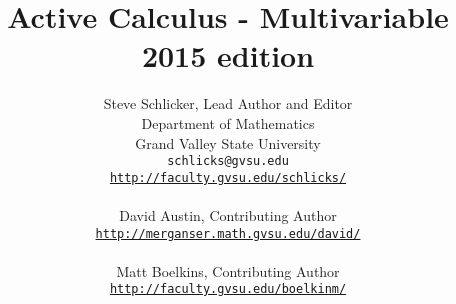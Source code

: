 \documentclass[11pt]{book}
\title{Active Calculus - Multivariable \\ \vspace{0.02in} \small{2015 edition} \\ \vspace{0.1in} \scalebox{0.75}{\texttt{[image: figures/CClicense.eps]}}}
\author{Steve Schlicker, Lead Author and Editor \\ Department of Mathematics \\ Grand Valley State University \\
\texttt{schlicks@gvsu.edu} \\
\href{http://faculty.gvsu.edu/schlicks/}{\texttt{http://faculty.gvsu.edu/schlicks/}}\\
\vspace{1.5in} \\
David Austin, Contributing Author \\
\href{http://merganser.math.gvsu.edu/david/}{\texttt{http://merganser.math.gvsu.edu/david/}} \\ \ \\
Matt Boelkins, Contributing Author \\
\href{http://faculty.gvsu.edu/boelkinm/}{\texttt{http://faculty.gvsu.edu/boelkinm/}} }
\theoremstyle{definition}
\begin{document}
\frontmatter
\maketitle
\tableofcontents



\mainmatter






\pagebreak

% 

\backmatter
	
\printindex
\end{document}
